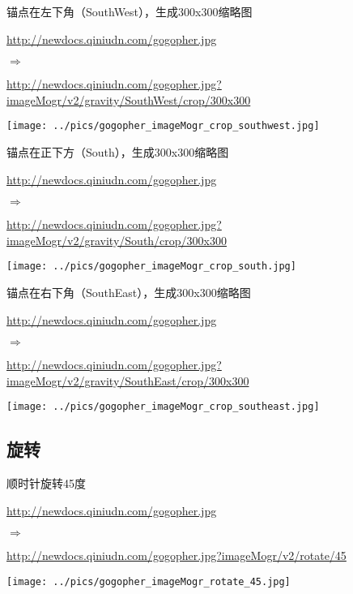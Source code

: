 \documentclass[11pt, oneside]{book}
\newcommand{\qsym}[1]{
\footnotesize
\noindent
#1\par
\normalsize
}
\newcommand{\qsamplelink}[1]{
\vspace{0.2em}
\noindent
#1\par
\vspace{0.1em}
}
\newcommand{\qurl}[1]{\footnotesize\url{#1}\normalsize}
\begin{document}
\begin{sample}
  \caption{锚点在左下角（SouthWest），生成300x300缩略图}
    \qsamplelink{\qurl{http://newdocs.qiniudn.com/gogopher.jpg}}
    \qsym{$\Rightarrow$}
    \qsamplelink{\qurl{http://newdocs.qiniudn.com/gogopher.jpg?imageMogr/v2/gravity/SouthWest/crop/300x300}}

    \begin{center}
      \texttt{[image: ../pics/gogopher\_imageMogr\_crop\_southwest.jpg]}
    \end{center}
  \label{imageMogr-crop-southwest}
\end{sample}

\begin{sample}
  \caption{锚点在正下方（South），生成300x300缩略图}
    \qsamplelink{\qurl{http://newdocs.qiniudn.com/gogopher.jpg}}
    \qsym{$\Rightarrow$}
    \qsamplelink{\qurl{http://newdocs.qiniudn.com/gogopher.jpg?imageMogr/v2/gravity/South/crop/300x300}}

    \begin{center}
      \texttt{[image: ../pics/gogopher\_imageMogr\_crop\_south.jpg]}
    \end{center}
  \label{imageMogr-crop-south}
\end{sample}

\begin{sample}
  \caption{锚点在右下角（SouthEast），生成300x300缩略图}
    \qsamplelink{\qurl{http://newdocs.qiniudn.com/gogopher.jpg}}
    \qsym{$\Rightarrow$}
    \qsamplelink{\qurl{http://newdocs.qiniudn.com/gogopher.jpg?imageMogr/v2/gravity/SouthEast/crop/300x300}}

    \begin{center}
      \texttt{[image: ../pics/gogopher\_imageMogr\_crop\_southeast.jpg]}
    \end{center}
  \label{imageMogr-crop-southeast}
\end{sample}

\clearpage

\subsection{旋转}

\begin{sample}
  \caption{顺时针旋转45度}
    \qsamplelink{\qurl{http://newdocs.qiniudn.com/gogopher.jpg}}
    \qsym{$\Rightarrow$}
    \qsamplelink{\qurl{http://newdocs.qiniudn.com/gogopher.jpg?imageMogr/v2/rotate/45}}

    \begin{center}
      \texttt{[image: ../pics/gogopher\_imageMogr\_rotate\_45.jpg]}
    \end{center}
  \label{imageMogr-rotate-45}
\end{sample}
\end{document}
